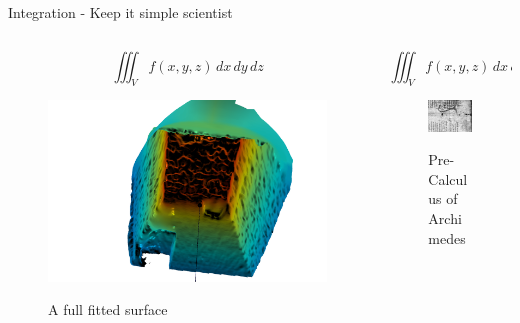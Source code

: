 \documentclass{beamer}
\begin{document}

\begin{frame}{Integration -  Keep it simple scientist}
\begin{columns}
\begin{column}{0.5\textwidth}  %
	\begin{center}
	\begin{equation}
	\iiint_V f(x,y,z) \,dx\,dy\,dz 
	\end{equation}
	\begin{figure}
		\includegraphics[width=0.5\linewidth]{Figures/meshlab}
		\label{meshlab}
		\caption{A full fitted surface}
	\end{figure}
	\end{center}
\end{column}
\begin{column}{0.5\textwidth}  %
	\begin{center}
		\begin{equation}
		\iiint_V f(x,y,z) \,dx\,dy\,dz 
		\end{equation}
		\begin{figure}
			\includegraphics[width=0.5\linewidth]{Figures/arch}
			\label{arch}
			\caption{Pre-Calculus of Archimedes}
		\end{figure}
	\end{center}
\end{column}
\end{columns}



\end{frame}
\end{document}
